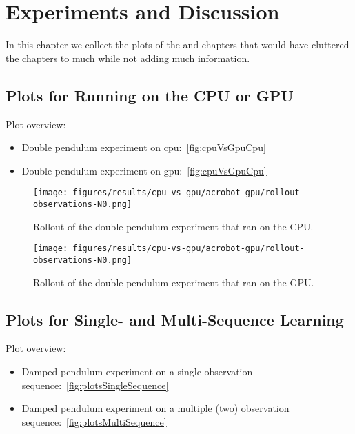 \chapter{Experiments and Discussion}



In this chapter we collect the plots of the  and  chapters that would have cluttered the chapters to much while not adding much information.

\section{Plots for Running on the CPU or GPU}
	\label{app:plotsCpuGpu}

	Plot overview:
	\begin{itemize}
		\item Double pendulum experiment on \ac{cpu}:~\autoref{fig:cpuVsGpuCpu}
		\item Double pendulum experiment on \ac{gpu}:~\autoref{fig:cpuVsGpuCpu}
	\end{itemize}

	\begin{figure}
		\centering
		\texttt{[image: figures/results/cpu-vs-gpu/acrobot-gpu/rollout-observations-N0.png]}
		\caption[Rollout of the double pendulum experiment that ran on the CPU]{Rollout of the double pendulum experiment that ran on the CPU.}
		\label{fig:cpuVsGpuCpu}
	\end{figure}
	\begin{figure}
		\centering
		\texttt{[image: figures/results/cpu-vs-gpu/acrobot-gpu/rollout-observations-N0.png]}
		\caption[Rollout of the double pendulum experiment that ran on the GPU]{Rollout of the double pendulum experiment that ran on the GPU.}
		\label{fig:cpuVsGpuGpu}
	\end{figure}

\section{Plots for Single- and Multi-Sequence Learning}
	\label{app:plotsSingleMulti}

	Plot overview:
	\begin{itemize}
		\item Damped pendulum experiment on a single observation sequence:~\autoref{fig:plotsSingleSequence}
		\item Damped pendulum experiment on a multiple (two) observation sequence:~\autoref{fig:plotsMultiSequence}
	\end{itemize}

